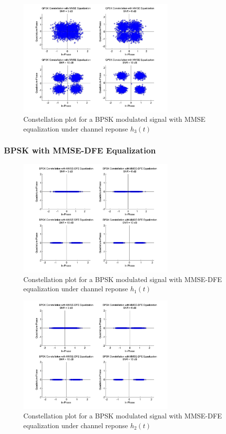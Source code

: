 \documentclass[]{article}
\begin{document}
\begin{figure}[H]
\centering
\includegraphics[width=0.7\textwidth]{qpConstMMSE3.jpg}
\caption{Constellation plot for a BPSK modulated signal with MMSE equalization under channel reponse $h_3(t)$}
\end{figure}

\subsubsection{BPSK with MMSE-DFE Equalization}

\begin{figure}[H]
\centering
\includegraphics[width=0.7\textwidth]{bpConstMMSEDFE1.jpg}
\caption{Constellation plot for a BPSK modulated signal with MMSE-DFE equalization under channel reponse $h_1(t)$}
\end{figure}

\begin{figure}[H]
\centering
\includegraphics[width=0.7\textwidth]{bpConstMMSEDFE2.jpg}
\caption{Constellation plot for a BPSK modulated signal with MMSE-DFE equalization under channel reponse $h_2(t)$}
\end{figure}
\end{document}
